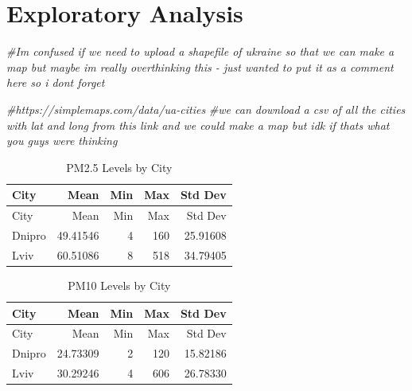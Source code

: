 \documentclass[
  12pt,
]{article}
\newenvironment{Shaded}{\begin{snugshade}}{\end{snugshade}}
\newcommand{\CommentTok}[1]{\textcolor[rgb]{0.56,0.35,0.01}{\textit{#1}}}
\begin{document}
\newpage

\hypertarget{exploratory-analysis}{%
\section{Exploratory Analysis}\label{exploratory-analysis}}

\begin{Shaded}
\begin{Highlighting}[]
\CommentTok{\#I\textquotesingle{}m confused if we need to upload a shapefile of ukraine so that we can make a map but maybe im really overthinking this {-} just wanted to put it as a comment here so i dont forget }

\CommentTok{\#https://simplemaps.com/data/ua{-}cities}
\CommentTok{\#we can download a csv of all the cities with lat and long from this link and we could make a map but idk if thats what you guys were thinking}
\end{Highlighting}
\end{Shaded}

\begin{longtable}[]{@{}lrrrr@{}}
\caption{PM2.5 Levels by City}\tabularnewline
\toprule
City & Mean & Min & Max & Std Dev \\
\midrule
\endfirsthead
\toprule
City & Mean & Min & Max & Std Dev \\
\midrule
\endhead
Dnipro & 49.41546 & 4 & 160 & 25.91608 \\
Lviv & 60.51086 & 8 & 518 & 34.79405 \\
\bottomrule
\end{longtable}

\begin{longtable}[]{@{}lrrrr@{}}
\caption{PM10 Levels by City}\tabularnewline
\toprule
City & Mean & Min & Max & Std Dev \\
\midrule
\endfirsthead
\toprule
City & Mean & Min & Max & Std Dev \\
\midrule
\endhead
Dnipro & 24.73309 & 2 & 120 & 15.82186 \\
Lviv & 30.29246 & 4 & 606 & 26.78330 \\
\bottomrule
\end{longtable}
\end{document}
